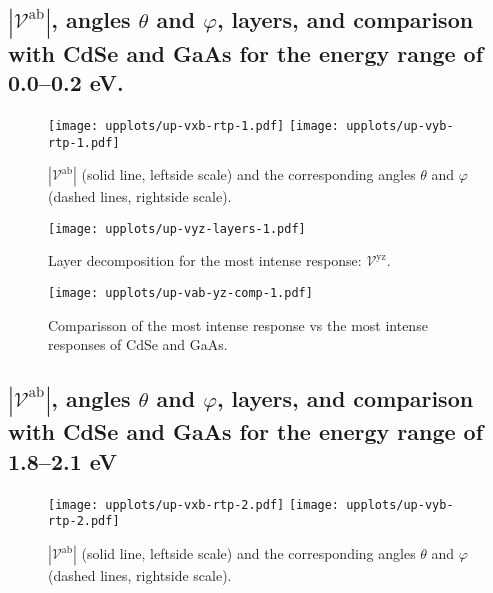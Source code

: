 \documentclass{article}
\let\Oldsubsection\subsection
\renewcommand{\subsection}{\FloatBarrier\Oldsubsection}
\begin{document}
\clearpage

\subsection{$|\mathcal{V}^{\mathrm{ab}}|$, angles
$\theta$ and $\varphi$, layers, and comparison with CdSe and GaAs for the energy
range of 0.0--0.2 eV.}

\begin{figure}[ht]
    \centering
    \texttt{[image: upplots/up-vxb-rtp-1.pdf]}
    \texttt{[image: upplots/up-vyb-rtp-1.pdf]}
    \caption{$|\mathcal{V}^{\mathrm{ab}}|$ (solid line, leftside scale) and the
    corresponding angles $\theta$ and $\varphi$ (dashed lines, rightside scale).}
    \label{fig:up-rtp1}
\end{figure}

\begin{figure}[ht]
    \centering
    \texttt{[image: upplots/up-vyz-layers-1.pdf]}
    \caption{Layer decomposition for the most intense response:
    $\mathcal{V}^{\mathrm{yz}}$.}
    \label{fig:up-lay1}
\end{figure}

\begin{figure}[ht]
    \centering
    \texttt{[image: upplots/up-vab-yz-comp-1.pdf]}
    \caption{Comparisson of the most intense response vs the most intense
    responses of CdSe and GaAs.}
    \label{fig:up-comp1}
\end{figure}

\subsection{$|\mathcal{V}^{\mathrm{ab}}|$, angles
$\theta$ and $\varphi$, layers, and comparison with CdSe and GaAs for the energy
range of 1.8--2.1 eV}

\begin{figure}[ht]
    \centering
    \texttt{[image: upplots/up-vxb-rtp-2.pdf]}
    \texttt{[image: upplots/up-vyb-rtp-2.pdf]}
    \caption{$|\mathcal{V}^{\mathrm{ab}}|$ (solid line, leftside scale) and the
    corresponding angles $\theta$ and $\varphi$ (dashed lines, rightside scale).}
    \label{fig:up-rtp2}
\end{figure}
\end{document}
